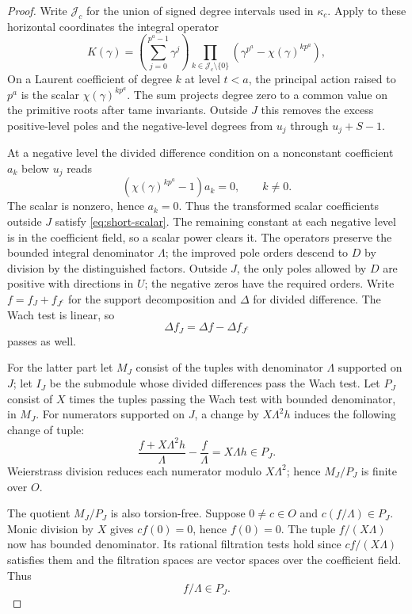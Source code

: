 \begin{proof}
Write \(\mathcal J_c\) for the union of signed degree intervals
used in \(\kappa_c\).
Apply to these horizontal coordinates the integral operator
\[
 K(\gamma)=\left(\sum_{j=0}^{p^a-1}\gamma^j\right)
     \prod_{k\in\mathcal J_c\setminus\{0\}}
            (\gamma^{p^a}-\chi(\gamma)^{kp^a}) ,
\]
On a Laurent coefficient of
degree \(k\) at level \(t<a\), the principal action raised to
\(p^a\) is the scalar \(\chi(\gamma)^{kp^a}\). The sum
projects degree zero to a common value on the primitive roots
after tame invariants. Outside \(J\) this removes the excess
positive-level poles and the negative-level degrees from \(u_j\)
through \(u_j+S-1\).

At a negative level the divided difference condition on a nonconstant coefficient \(a_k\) below \(u_j\) reads
\[
 (\chi(\gamma)^{kp^a}-1)a_k=0,\qquad k\ne0.
\]
The scalar is nonzero, hence \(a_k=0\).
Thus the transformed scalar coefficients outside \(J\) satisfy
\eqref{eq:short-scalar}. The remaining constant at each negative
level is in the coefficient field, so a scalar power clears it.
The operators preserve the bounded integral denominator
\(\Lambda\); the improved pole orders descend to \(D\) by
division by the distinguished factors. Outside \(J\), the only poles allowed by \(D\) are positive with directions in \(U\); the negative zeros have the required orders. Write \(f=f_J+f_{J^c}\) for the support decomposition and \(\Delta\) for divided difference. The Wach test is linear, so
\[
 \Delta f_J=\Delta f-\Delta f_{J^c}
\]
passes as well.

For the latter part let \(M_J\) consist of the tuples with
denominator \(\Lambda\) supported on \(J\); let \(I_J\) be
the submodule whose divided differences pass the Wach test.
Let \(P_J\) consist of \(X\) times the tuples passing the Wach test
with bounded denominator, in \(M_J\). For numerators supported on \(J\),
a change by \(X\Lambda^2h\) induces the following change of tuple:
\[
 \frac{f+X\Lambda^2 h}{\Lambda}-\frac{f}{\Lambda}
       =X\Lambda h\in P_J .
\]
Weierstrass division reduces each numerator modulo \(X\Lambda^2\);
hence \(M_J/P_J\) is finite over \(O\).

The quotient \(M_J/P_J\) is also torsion-free.
Suppose \(0\ne c\in O\) and \(c(f/\Lambda)\in P_J\). Monic division by
\(X\) gives \(cf(0)=0\), hence \(f(0)=0\). The tuple
\(f/(X\Lambda)\) now has bounded denominator. Its rational filtration
tests hold since \(c f/(X\Lambda)\) satisfies them and the filtration
spaces are vector spaces over the coefficient field. Thus
\[
 f/\Lambda\in P_J.
\]



\end{proof}
